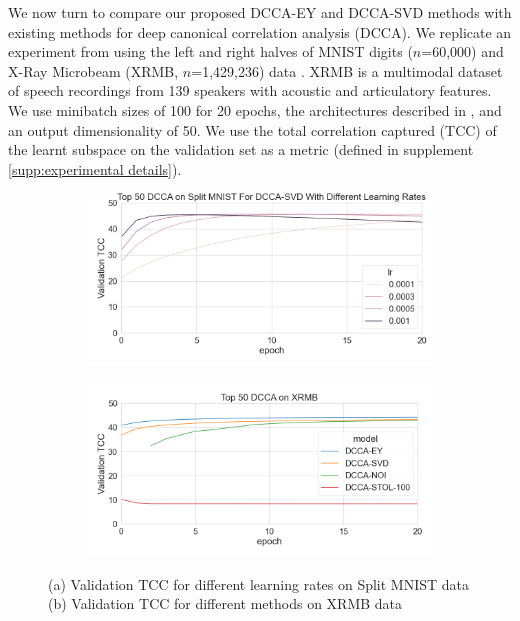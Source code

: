 We now turn to compare our proposed DCCA-EY and DCCA-SVD methods with existing methods for deep canonical correlation analysis (DCCA). We replicate an experiment from \cite{wang2015stochastic} using the left and right halves of MNIST \cite{lecun1998gradient} digits ($n$=60,000) and X-Ray Microbeam (XRMB, $n$=1,429,236) data \cite{westbury1994x}. XRMB is a multimodal dataset of speech recordings from 139 speakers with acoustic and articulatory features. We use minibatch sizes of 100 for 20 epochs, the architectures described in \cite{wang2015stochastic}, and an output dimensionality of 50.  We use the total correlation captured (TCC) of the learnt subspace on the validation set as a metric (defined in supplement \ref{supp:experimental details}).

\begin{figure}
     \centering
     \begin{subfigure}[b]{0.49\textwidth}
         \centering
         \includegraphics[width=\textwidth]{figures/deep_learning/DCCA/dcca_lr_experiment.png}
         \caption{}
         \label{fig:lrexp}
     \end{subfigure}
     \hfill
     \begin{subfigure}[b]{0.49\textwidth}
         \centering
         \includegraphics[width=\textwidth]{figures/deep_learning/DCCA/dcca_XRMB.png}
         \caption{}
                 \label{fig:xrmb}
     \end{subfigure}
        \caption{ (a) Validation TCC for different learning rates on Split MNIST data (b) Validation TCC for different methods on XRMB data}

\end{figure}

